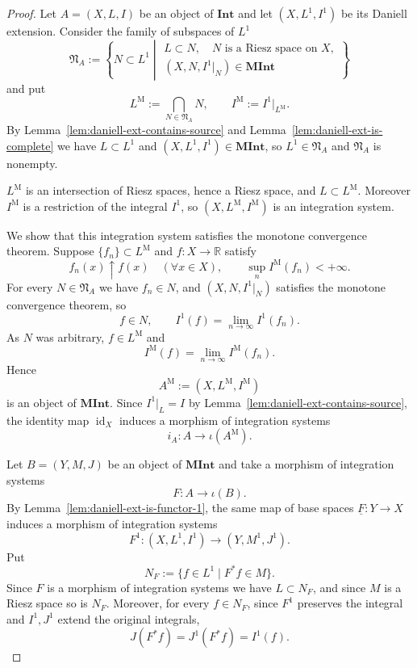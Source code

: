 \begin{proof}
  Let $A=(X,L,I)$ be an object of $\mathbf{Int}$ and let $(X,L^1,I^1)$ be its
  Daniell extension. Consider the family of subspaces of $L^1$
  \[
    \mathfrak{N}_A
    :=\left\{
      N\subset L^1
      \mathrel{}\middle|\mathrel{}
      \begin{array}{l}
        L\subset N,\quad N\text{ is a Riesz space on $X$},\\
        (X,N,I^1|_N)\in\mathbf{MInt}
      \end{array}
    \right\}
  \]
  and put
  \[
    L^{\mathrm{M}}:=\bigcap_{N\in\mathfrak{N}_A}N,
    \qquad
    I^{\mathrm{M}}:=I^1|_{L^{\mathrm{M}}} .
  \]
  By Lemma~\ref{lem:daniell-ext-contains-source} and
  Lemma~\ref{lem:daniell-ext-is-complete} we have $L\subset L^1$ and
  $(X,L^1,I^1)\in\mathbf{MInt}$, so $L^1\in\mathfrak{N}_A$ and
  $\mathfrak{N}_A$ is nonempty.

  $L^{\mathrm{M}}$ is an intersection of Riesz spaces, hence a Riesz space, and
  $L\subset L^{\mathrm{M}}$. Moreover $I^{\mathrm{M}}$ is a restriction of the
  integral $I^1$, so $(X,L^{\mathrm{M}},I^{\mathrm{M}})$ is an integration
  system.

  We show that this integration system satisfies the monotone convergence
  theorem. Suppose $\{f_n\}\subset L^{\mathrm{M}}$ and $f:X\to\mathbb{R}$ satisfy
  \[
    f_n(x)\uparrow f(x)\quad(\forall x\in X),
    \qquad
    \sup_n I^{\mathrm{M}}(f_n)<+\infty .
  \]
  For every $N\in\mathfrak{N}_A$ we have $f_n\in N$, and $(X,N,I^1|_N)$
  satisfies the monotone convergence theorem, so
  \[
    f\in N,
    \qquad
    I^1(f)=\lim_{n\to\infty}I^1(f_n).
  \]
  As $N$ was arbitrary, $f\in L^{\mathrm{M}}$ and
  \[
    I^{\mathrm{M}}(f)=\lim_{n\to\infty}I^{\mathrm{M}}(f_n).
  \]
  Hence
  \[
    A^{\mathrm{M}}:=(X,L^{\mathrm{M}},I^{\mathrm{M}})
  \]
  is an object of $\mathbf{MInt}$. Since $I^1|_L=I$ by
  Lemma~\ref{lem:daniell-ext-contains-source}, the identity map
  $\operatorname{id}_X$ induces a morphism of integration systems
  \[
    i_A:A\to\iota(A^{\mathrm{M}}) .
  \]

  Let $B=(Y,M,J)$ be an object of $\mathbf{MInt}$ and take a morphism of
  integration systems
  \[
    F:A\to\iota(B) .
  \]
  By Lemma~\ref{lem:daniell-ext-is-functor-1}, the same map of base spaces
  $\underline{F}:Y\to X$ induces a morphism of integration systems
  \[
    F^1:(X,L^1,I^1)\to(Y,M^1,J^1) .
  \]
  Put
  \[
    N_F:=\{f\in L^1\mid F^*f\in M\} .
  \]
  Since $F$ is a morphism of integration systems we have $L\subset N_F$, and
  since $M$ is a Riesz space so is $N_F$. Moreover, for every $f\in N_F$, since
  $F^1$ preserves the integral and $I^1,J^1$ extend the original integrals,
  \[
    J(F^*f)=J^1(F^*f)=I^1(f).
  \]


\end{proof}
